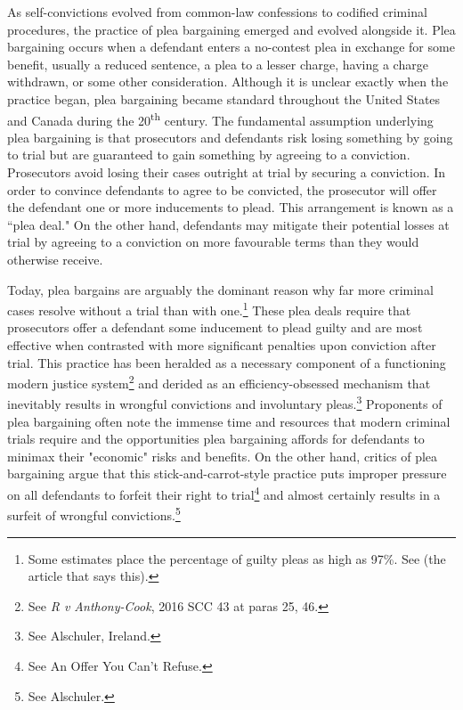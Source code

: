 As self-convictions evolved from common-law confessions to codified criminal procedures, the practice of plea bargaining emerged and evolved alongside it. Plea bargaining occurs when a defendant enters a no-contest plea in exchange for some benefit, usually a reduced sentence, a plea to a lesser charge, having a charge withdrawn, or some other consideration. Although it is unclear exactly when the practice began, plea bargaining became standard throughout the United States and Canada during the 20\textsuperscript{th} century. The fundamental assumption underlying plea bargaining is that prosecutors and defendants risk losing something by going to trial but are guaranteed to gain something by agreeing to a conviction. Prosecutors avoid losing their cases outright at trial by securing a conviction. In order to convince defendants to agree to be convicted, the prosecutor will offer the defendant one or more inducements to plead. This arrangement is known as a ``plea deal."  On the other hand, defendants may mitigate their potential losses at trial by agreeing to a conviction on more favourable terms than they would otherwise receive. 

Today, plea bargains are arguably the dominant reason why far more criminal cases resolve without a trial than with one.\footnote{Some estimates place the percentage of guilty pleas as high as 97\%. See (the article that says this).} These plea deals require that prosecutors offer a defendant some inducement to plead guilty and are most effective when contrasted with more significant penalties upon conviction after trial. This practice has been heralded as a necessary component of a functioning modern justice system\footnote{See \textit{R v Anthony-Cook}, 2016 SCC 43 at paras 25, 46.} and derided as an efficiency-obsessed mechanism that inevitably results in wrongful convictions and involuntary pleas.\footnote{See Alschuler, Ireland.} Proponents of plea bargaining often note the immense time and resources that modern criminal trials require and the opportunities plea bargaining affords for defendants to minimax their "economic" risks and benefits. On the other hand, critics of plea bargaining argue that this stick-and-carrot-style practice puts improper pressure on all defendants to forfeit their right to trial\footnote{See An Offer You Can't Refuse.} and almost certainly results in a surfeit of wrongful convictions.\footnote{See Alschuler.}

